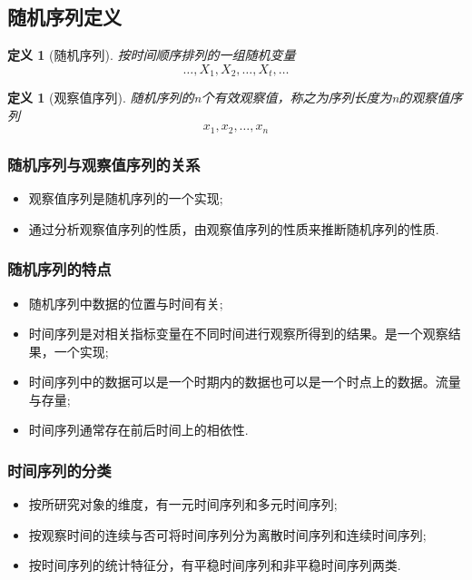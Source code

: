 \documentclass[12pt, a4paper, oneside]{ctexbook}
\newtheorem{definition}[theorem]{定义}
\begin{document}
\subsection{随机序列定义}
\begin{definition}[随机序列]
    按时间顺序排列的一组随机变量
    \begin{equation*}
        \ldots,X_1,X_2,\ldots,X_{t},\ldots
    \end{equation*}
\end{definition}

\begin{definition}[观察值序列]
    随机序列的n个有效观察值，称之为序列长度为n的观察值序列
    \begin{equation*}
        x_1,x_2,\ldots,x_{n}
    \end{equation*}
\end{definition}

\subsubsection{随机序列与观察值序列的关系}
\begin{itemize}
    \item 观察值序列是随机序列的一个实现;
    \item 通过分析观察值序列的性质，由观察值序列的性质来推断随机序列的性质.
\end{itemize}

\subsubsection*{随机序列的特点}
\begin{itemize}
    \item 随机序列中数据的位置与时间有关;
    \item 时间序列是对相关指标变量在不同时间进行观察所得到的结果。是一个观察结果，一个实现;
    \item 时间序列中的数据可以是一个时期内的数据也可以是一个时点上的数据。流量与存量;
    \item 时间序列通常存在前后时间上的相依性.
\end{itemize}

\subsubsection*{时间序列的分类}
\begin{itemize}
    \item 按所研究对象的维度，有一元时间序列和多元时间序列;
    \item 按观察时间的连续与否可将时间序列分为离散时间序列和连续时间序列;
    \item 按时间序列的统计特征分，有平稳时间序列和非平稳时间序列两类.
\end{itemize}
\end{document}
